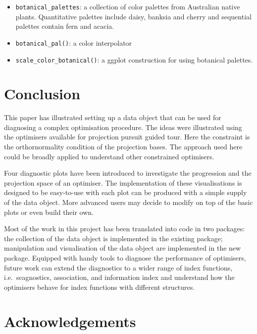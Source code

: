 \begin{itemize}
  \begin{itemize}
  \tightlist
  \item
    \texttt{botanical\_palettes}: a collection of color palettes from
    Australian native plants. Quantitative palettes include daisy,
    banksia and cherry and sequential palettes contain fern and acacia.
  \item
    \texttt{botanical\_pal()}: a color interpolator
  \item
    \texttt{scale\_color\_botanical()}: a ggplot construction for using
    botanical palettes.
  \end{itemize}
\end{itemize}

\hypertarget{conclusion}{%
\section{Conclusion}\label{conclusion}}

This paper has illustrated setting up a data object that can be used for
diagnosing a complex optimisation procedure. The ideas were illustrated
using the optimisers available for projection pursuit guided tour. Here
the constraint is the orthornormality condition of the projection bases.
The approach used here could be broadly applied to understand other
constrained optimisers.

Four diagnostic plots have been introduced to investigate the
progression and the projection space of an optimiser. The implementation
of these visualisations is designed to be easy-to-use with each plot can
be produced with a simple supply of the data object. More advanced users
may decide to modify on top of the basic plots or even build their own.

Most of the work in this project has been translated into code in two
packages: the collection of the data object is implemented in the
existing \citep{tourr} package; manipulation and
visualisation of the data object are implemented in the new 
package. Equipped with handy tools to diagnose the performance of
optimisers, future work can extend the diagnostics to a wider range of
index functions, i.e.~scagnostics, association, and information index
\citep{laa2020using} and understand how the optimisers behave for index
functions with different structures.

\hypertarget{acknowledgements}{%
\section{Acknowledgements}\label{acknowledgements}}

